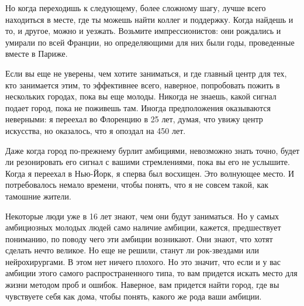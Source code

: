 \documentclass[ebook,12pt,oneside,openany]{memoir}
\begin{document}
Но когда переходишь к следующему, более сложному шагу, лучше всего
находиться в месте, где ты можешь найти коллег и поддержку. Когда
найдешь и то, и другое, можно и уезжать. Возьмите импрессионистов: они
рождались и умирали по всей Франции, но определяющими для них были
годы, проведенные вместе в Париже.


Если вы еще не уверены, чем хотите заниматься, и где главный центр для
тех, кто занимается этим, то эффективнее всего, наверное, попробовать
пожить в нескольких городах, пока вы еще молоды. Никогда не знаешь,
какой сигнал подает город, пока не поживешь там. Иногда предположения
оказываются неверными: я переехал во Флоренцию в 25 лет, думая, что
увижу центр искусства, но оказалось, что я опоздал на 450 лет.

Даже когда город по-прежнему бурлит амбициями, невозможно знать точно,
будет ли резонировать его сигнал с вашими стремлениями, пока вы его не
услышите. Когда я переехал в Нью-Йорк, я сперва был восхищен. Это
волнующее место. И потребовалось немало времени, чтобы понять, что я
не совсем такой, как тамошние жители.

Некоторые люди уже в 16 лет знают, чем они будут заниматься. Но у
самых амбициозных молодых людей само наличие амбиции, кажется,
предшествует пониманию, по поводу чего эти амбиции возникают. Они
знают, что хотят сделать нечто великое. Но еще не решили, станут ли
рок-звездами или нейрохирургами. В этом нет ничего плохого. Но это
значит, что если и у вас амбиции этого самого распространенного типа,
то вам придется искать место для жизни методом проб и ошибок.
Наверное, вам придется найти город, где вы чувствуете себя как дома,
чтобы понять, какого же рода ваши амбиции.
\end{document}
